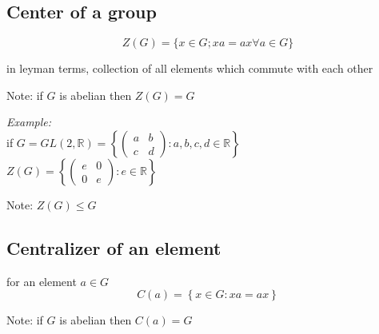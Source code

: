 \documentclass[11pt,letterpaper]{article}
\newenvironment{example}                             
        {\noindent\textit{Example:}\\}
	{}
\begin{document}
\subsection{Center of a group}
\[
  Z(G) = \{ x \in G ; xa = ax \forall a \in G \}
\]

in leyman terms, collection of all elements which commute with each other 

Note: if $G$ is abelian then $Z(G) = G$

\begin{example}
  if $G = GL(2,\mathbb{R}) = \left\{ \begin{pmatrix}
      a & b \\ c & d
  \end{pmatrix}: a,b,c,d \in \mathbb{R}\right\}$\\
  $Z(G) = \left\{ \begin{pmatrix}
      e & 0 \\ 0 & e 
  \end{pmatrix} : e \in \mathbb{R}\right\}$
\end{example}


\begin{fbox}
  {Note: $Z(G) \leq G$}
\end{fbox}

\subsection{Centralizer of an element}
for an element $a \in G$
\[
  C(a) = \left\{ x \in G : xa = ax \right\}
\]

Note: if $G$ is abelian then $C(a) = G$
\end{document}
